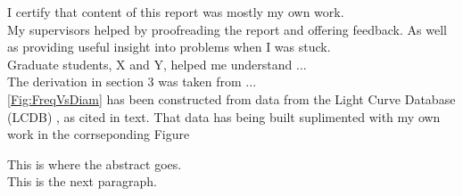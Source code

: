 \documentclass{UCreport}
\begin{document}




\buildmargins %
\buildcover %



\declaration

I certify that content of this report was mostly my own work.
\\

My supervisors helped by proofreading the report and offering feedback. As well as providing useful insight into problems when I was stuck.\\

Graduate students, X and Y, helped me understand ... \\

The derivation in section 3 was taken from ... \\

\autoref{Fig:FreqVsDiam} has been constructed from data from the Light Curve Database (LCDB) \citet{Warner2009}, as cited in text. That data has being built suplimented with my own work in the corrseponding Figure %

\vspace{2cm}
\begin{centering}
  \textbf{\student}\par
\end{centering}

\newpage


\abstract

This is where the abstract goes. \\

This is the next paragraph.





\newpage
\end{document}
